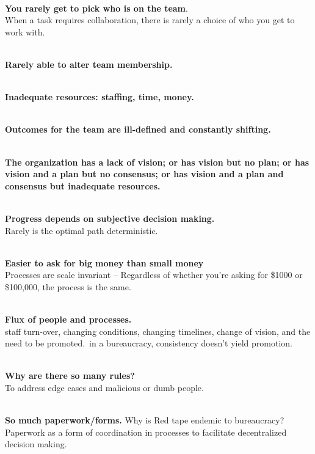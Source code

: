 \ \\

\textbf{You rarely get to pick who is on the team}. \\
When a task requires collaboration, there is rarely a choice of who you get to work with. 

\ \\

\textbf{Rarely able to alter team membership.}

\ \\

\textbf{Inadequate resources: staffing, time, money.}

\ \\

\textbf{Outcomes for the team are ill-defined and constantly shifting.}

\ \\

\textbf{The organization has a lack of vision; or has vision but no plan; or has vision and a plan but no consensus; or has vision and a plan and consensus but inadequate resources.}

\ \\

\textbf{Progress depends on subjective decision making.}\\
Rarely is the optimal path deterministic. 

\ \\

\textbf{Easier to ask for big money than small money}\\
Processes are scale invariant -- Regardless of whether you're asking for \$1000 or \$100,000, the process is the same. 

\ \\

\textbf{Flux of people and processes.} \\
staff turn-over, changing conditions, changing timelines, change of vision, and the need to be promoted. in a bureaucracy, consistency doesn't yield promotion.

\ \\

\textbf{Why are there so many rules?}\\
To address edge cases and malicious or dumb people.

\ \\

\textbf{So much paperwork/forms.}
Why is Red tape endemic to bureaucracy?\\
Paperwork as a form of coordination in processes to facilitate decentralized decision making. 

